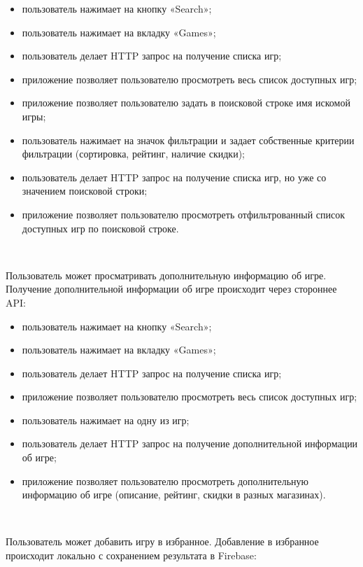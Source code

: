 \begin{itemize}
  \item пользователь нажимает на кнопку «Search»;
  \item пользователь нажимает на вкладку «Games»;
  \item пользователь делает HTTP запрос на получение списка игр;
  \item приложение позволяет пользователю просмотреть весь список доступных игр;
  \item приложение позволяет пользователю задать в поисковой строке имя искомой игры;
  \item пользователь нажимает на значок фильтрации и задает собственные критерии фильтрации (сортировка, рейтинг, наличие скидки);
  \item пользователь делает HTTP запрос на получение списка игр, но уже со значением поисковой строки;
  \item приложение позволяет пользователю просмотреть отфильтрованный список доступных игр по поисковой строке.
\end{itemize}

~\par

Пользователь может просматривать дополнительную информацию об игре. Получение дополнительной информации об игре происходит через стороннее API:

\begin{itemize}
  \item пользователь нажимает на кнопку «Search»;
  \item пользователь нажимает на вкладку «Games»;
  \item пользователь делает HTTP запрос на получение списка игр;
  \item приложение позволяет пользователю просмотреть весь список доступных игр;
  \item пользователь нажимает на одну из игр;
  \item пользователь делает HTTP запрос на получение дополнительной информации об игре;
  \item приложение позволяет пользователю просмотреть дополнительную информацию об игре (описание, рейтинг, скидки в разных магазинах).
\end{itemize}


~\par

Пользователь может добавить игру в избранное. Добавление в избранное происходит локально с сохранением результата в Firebase:

